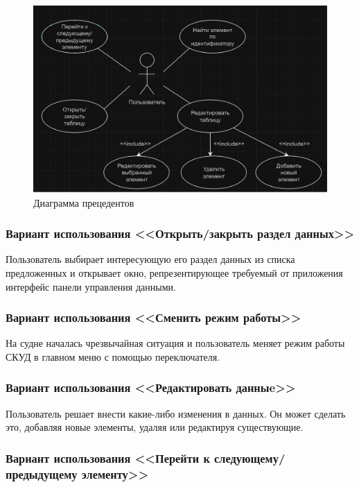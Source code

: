 \begin{figure}[ht]
	\centering
	\includegraphics[width=1\linewidth]{images/CommonScheme2}
	\caption{Диаграмма прецедентов}
	\label{fig:commonscheme2}
\end{figure}

\subsubsection{Вариант использования <<Открыть/закрыть раздел данных>>}

Пользователь выбирает интересующую его раздел данных из списка предложенных и открывает окно, репрезентирующее требуемый от приложения интерфейс панели управления данными.
\subsubsection{Вариант использования <<Сменить режим работы>>}

На судне началась чрезвычайная ситуация и пользователь меняет режим работы СКУД в главном меню с помощью переключателя.

\subsubsection{Вариант использования <<Редактировать данныe>>}

Пользователь решает внести какие-либо изменения в данных. Он может сделать это, добавляя новые элементы, удаляя или редактируя существующие.

\subsubsection{Вариант использования <<Перейти к следующему/предыдущему элементу>>}

